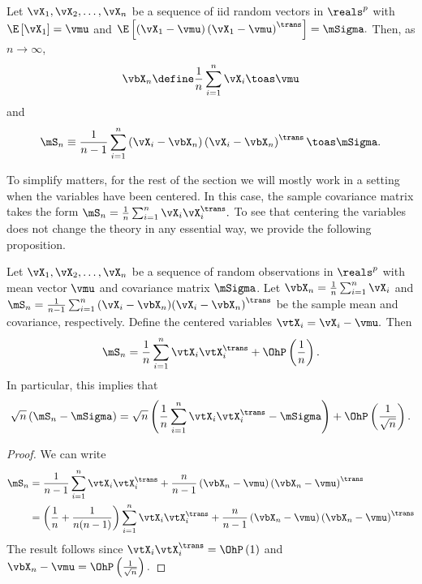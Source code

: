 \begin{proposition}\label{P:suff-stat-limits}
Let $\vX_1, \vX_2, \ldots, \vX_n$ be a sequence of iid random vectors in $\reals^p$ with
\(
    \E \left[
        \vX_1
    \right]
    =
    \vmu
\)
and
\(
    \E \left[
        \left( \vX_1 - \vmu \right)
        \left( \vX_1 - \vmu \right)^\trans
    \right]
    =
    \mSigma.
\)
Then, as $n \to \infty$,
\[
    \vbX_n
    \define
    \frac{1}{n}
    \sum_{i=1}^n
        \vX_i
    \toas
    \vmu
\]
and
\[
    \mS_n
    \equiv
    \frac{1}{n-1}
    \sum_{i=1}^{n}
        \left( \vX_i - \vbX_n \right)
        \left( \vX_i - \vbX_n \right)^\trans
    \toas
    \mSigma.
\]
\end{proposition}

To simplify matters, for the rest of the section we will mostly work in a setting when the variables have been centered.  In this case, the sample covariance matrix takes the form
\(
    \mS_n = \frac{1}{n} \sum_{i=1}^n \vX_i \vX_i^\trans.
\)
To see that centering the variables does not change the theory in any essential way, we provide the following proposition.

\begin{proposition}
Let $\vX_1, \vX_2, \ldots, \vX_n$ be a sequence of random observations in $\reals^p$ with mean vector $\vmu$ and covariance matrix $\mSigma$.  Let
\(
    \vbX_n = \frac{1}{n} \sum_{i=1}^n \vX_i
\)
and
\(
    \mS_n
    =
    \frac{1}{n-1}
    \sum_{i=1}^n
        \left( \vX_i - \vbX_n \right) \!
        \left( \vX_i - \vbX_n \right)^\trans
\)
be the sample mean and covariance, respectively.  Define the centered
variables
\(
    \vtX_i = \vX_i - \vmu.
\)
Then
\[
    \mS_n
    =
    \frac{1}{n}
    \sum_{i=1}^n
        \vtX_i \vtX_i^\trans
    +
    \OhP\left( \frac{1}{n} \right).
\]
In particular, this implies that
\[
    \sqrt{n}
    \left(
        \mS_n - \mSigma
    \right)
    =
    \sqrt{n}
    \left(
        \frac{1}{n}
        \sum_{i=1}^n
            \vtX_i \vtX_i^\trans
        -
        \mSigma
    \right)
    + 
    \OhP \left( \frac{1}{\sqrt{n}} \right).
\]
\end{proposition}
\begin{proof}
We can write
\begin{align*}
    \mS_n &= \frac{1}{n-1}
             \sum_{i=1}^n \vtX_i \vtX_i^\trans
             +
             \frac{n}{n-1}
             \left(
                \vbX_n - \vmu
             \right)
             \left(
                \vbX_n - \vmu
             \right)^\trans \\
          &= \left(
                \frac{1}{n}
                +
                \frac{1}{n (n-1) }
             \right)
             \sum_{i=1}^n \vtX_i \vtX_i^\trans
             +
             \frac{n}{n-1}
             \left(
                \vbX_n - \vmu
             \right)
             \left(
                \vbX_n - \vmu
             \right)^\trans
\end{align*}
The result follows since
\(
    \vtX_i \vtX_i^\trans = \OhP \left( 1 \right)
\)
and
\(
    \vbX_n - \vmu 
    = 
    \OhP \left( \frac{1}{ \sqrt{n} } \right).
\)

\end{proof}

